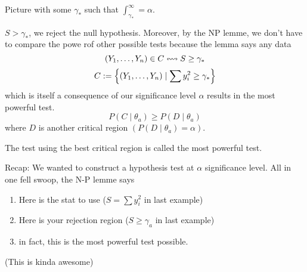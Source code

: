 \nl Picture with some $\gamma_*$ such that $\int_{\gamma_*}^{\infty} = \alpha$.

\nl $S > \gamma_*$, we reject the null hypothesis. Moreover, by the NP lemme, we don't have to compare the powe rof other possible tests because the lemma says any data
$$({Y}_1, \dots, {Y}_n) \in C \leftrightsquigarrow S \geq \gamma_*$$
$$C := \left\{ ({Y}_1, \dots, {Y}_n) \mid \sum y_i^2 \geq \gamma_* \right\}$$
which is itself a consequence of our significance level $\alpha$ results in the most powerful test. 
$$P(C \mid \theta_a) \geq P(D \mid \theta_a)$$
where $D$ is another critical region $(P(D \mid \theta_a) = \alpha )$.

 The test using the best critical region is called the most powerful test. 

\nl Recap: We wanted to construct a hypothesis test at $\alpha$ significance level. All in one fell swoop, the N-P lemme says
\begin{enumerate}
    \item Here is the stat to use ($S = \sum y_i^2$ in last example) 
    \item Here is your rejection region ($S \geq \gamma_a$ in last example)
    \item in fact, this is the most powerful test possible.
\end{enumerate}
(This is kinda awesome)


